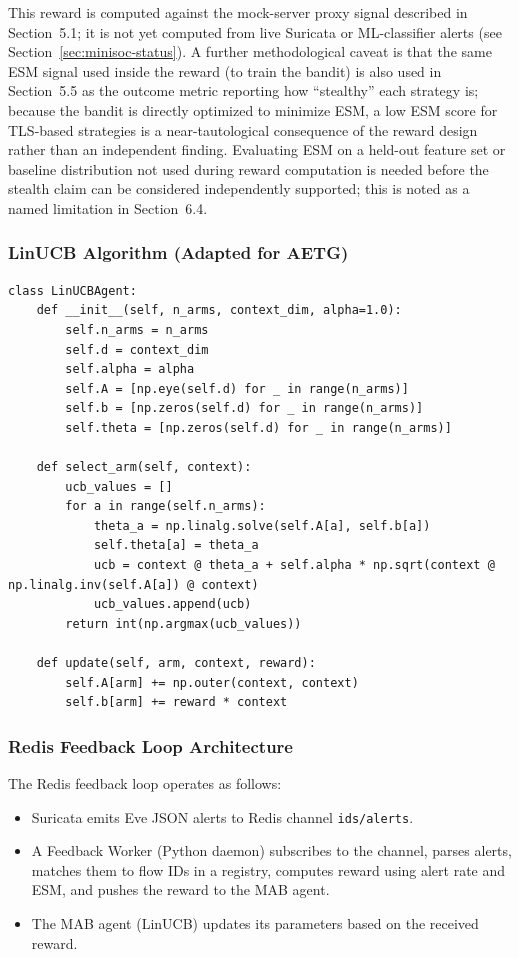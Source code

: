 \documentclass[review]{elsarticle}
\begin{document}
This reward is computed against the mock-server proxy signal described in Section~5.1; it is not yet computed from live Suricata or ML-classifier alerts (see Section~\ref{sec:minisoc-status}). A further methodological caveat is that the same ESM signal used inside the reward (to train the bandit) is also used in Section~5.5 as the outcome metric reporting how ``stealthy'' each strategy is; because the bandit is directly optimized to minimize ESM, a low ESM score for TLS-based strategies is a near-tautological consequence of the reward design rather than an independent finding. Evaluating ESM on a held-out feature set or baseline distribution not used during reward computation is needed before the stealth claim can be considered independently supported; this is noted as a named limitation in Section~6.4.

\subsubsection{LinUCB Algorithm (Adapted for AETG)}
\begin{lstlisting}
class LinUCBAgent:
    def __init__(self, n_arms, context_dim, alpha=1.0):
        self.n_arms = n_arms
        self.d = context_dim
        self.alpha = alpha
        self.A = [np.eye(self.d) for _ in range(n_arms)]
        self.b = [np.zeros(self.d) for _ in range(n_arms)]
        self.theta = [np.zeros(self.d) for _ in range(n_arms)]

    def select_arm(self, context):
        ucb_values = []
        for a in range(self.n_arms):
            theta_a = np.linalg.solve(self.A[a], self.b[a])
            self.theta[a] = theta_a
            ucb = context @ theta_a + self.alpha * np.sqrt(context @ np.linalg.inv(self.A[a]) @ context)
            ucb_values.append(ucb)
        return int(np.argmax(ucb_values))

    def update(self, arm, context, reward):
        self.A[arm] += np.outer(context, context)
        self.b[arm] += reward * context
\end{lstlisting}

\subsubsection{Redis Feedback Loop Architecture}
The Redis feedback loop operates as follows:
\begin{itemize}
\item Suricata emits Eve JSON alerts to Redis channel \texttt{ids/alerts}.
\item A Feedback Worker (Python daemon) subscribes to the channel, parses alerts, matches them to flow IDs in a registry, computes reward using alert rate and ESM, and pushes the reward to the MAB agent.
\item The MAB agent (LinUCB) updates its parameters based on the received reward.
\end{itemize}
\end{document}
